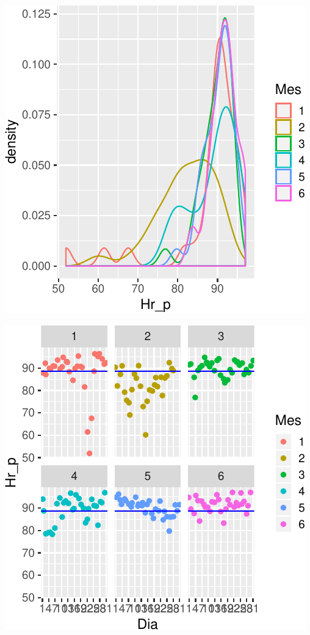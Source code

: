 \documentclass[letterpaper,9pt,twocolumn,twoside,]{pinp}
\begin{document}
\begin{center}\includegraphics{report_hidrolgy_files/figure-latex/unnamed-chunk-6-1} \end{center}

\begin{center}\includegraphics{report_hidrolgy_files/figure-latex/unnamed-chunk-7-1} \end{center}
\end{document}
